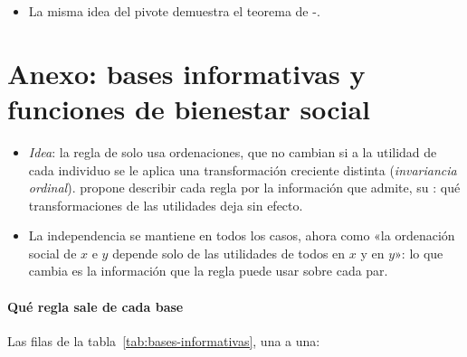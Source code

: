 \documentclass[11pt]{article}
\begin{document}
\begin{itemize}
\item La misma idea del pivote demuestra el teorema de -\nocite{Reny2001Arrow}.
\end{itemize}

\section{Anexo: bases informativas y funciones de bienestar social}\label{anexo:bases-informativas}

\begin{itemize}
\item \emph{Idea}: la regla de  solo usa ordenaciones, que no cambian si a la utilidad de cada individuo se le aplica una transformación creciente distinta (\emph{invariancia ordinal}). \textcite{Sen1970Collective} propone describir cada regla por la información que admite, su : qué transformaciones de las utilidades deja sin efecto\nocite{dAspremontGevers1977Equity,dAspremontGevers2002Social}.
\item La independencia se mantiene en todos los casos, ahora como «la ordenación social de $x$ e $y$ depende solo de las utilidades de todos en $x$ y en $y$»: lo que cambia es la información que la regla puede usar sobre cada par.
\end{itemize}

\paragraph{Qué regla sale de cada base}

Las filas de la tabla~\ref{tab:bases-informativas}, una a una:
\end{document}

